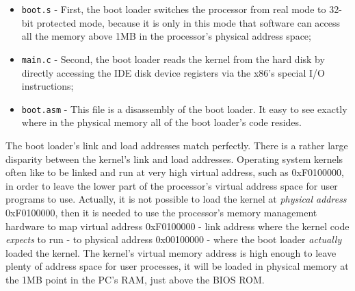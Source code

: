 \begin{itemize}
\item \texttt{boot.s} - First, the boot loader switches the processor from real mode to 32-bit protected mode, because  it is only in this mode that software can access all the memory above 1MB in the processor's physical address space;
\item \texttt{main.c} - Second, the boot loader reads the kernel from the hard disk by directly accessing the IDE disk device registers via the x86's special I/O instructions;
\item \texttt{boot.asm} - This file is a disassembly of the boot loader. It easy to see exactly where in the physical memory all of the boot loader's code resides.
\end{itemize}

The boot loader's link and load addresses match perfectly. There is a rather large disparity between the kernel's link and load addresses. Operating system kernels often like to be linked and run at very high virtual address, such as 0xF0100000, in order to leave the lower part of the processor's virtual address space for user programs to use. Actually, it is not possible to load the kernel at \textit{physical address} 0xF0100000, then it is needed to use the processor's memory management hardware to map virtual address 0xF0100000 - link address where the kernel code \emph{expects} to run - to physical address 0x00100000 - where the boot loader \textit{actually} loaded the kernel. The kernel's virtual memory address is high enough to leave plenty of address space for user processes, it will be loaded in physical memory at the 1MB point in the PC's RAM, just above the BIOS ROM.

